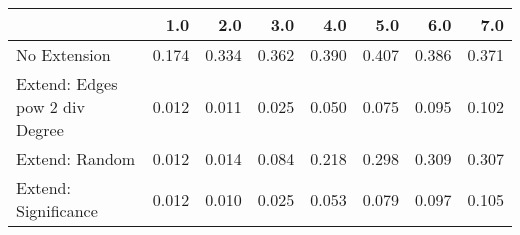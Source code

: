 \begin{tabular}{lrrrrrrr}
\toprule
{} &   1.0 &   2.0 &   3.0 &   4.0 &   5.0 &   6.0 &   7.0 \\
\midrule
No Extension                   & 0.174 & 0.334 & 0.362 & 0.390 & 0.407 & 0.386 & 0.371 \\
Extend: Edges pow 2 div Degree & 0.012 & 0.011 & 0.025 & 0.050 & 0.075 & 0.095 & 0.102 \\
Extend: Random                 & 0.012 & 0.014 & 0.084 & 0.218 & 0.298 & 0.309 & 0.307 \\
Extend: Significance           & 0.012 & 0.010 & 0.025 & 0.053 & 0.079 & 0.097 & 0.105 \\
\bottomrule
\end{tabular}

